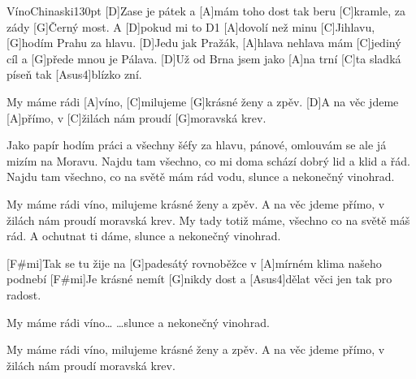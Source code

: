 \begin{song}{Víno}{Chinaski}{130pt}
%
[D]Zase je pátek a [A]mám toho dost
tak beru [C]kramle, za zády [G]{Čer}ný most.
A [D]pokud mi to D1 [A]dovolí
než minu [C]Jihlavu, [G]hodím Prahu za hlavu.
[D]Jedu jak Pražák, [A]hlava nehlava
mám [C]jediný cíl a [G]přede mnou je Pálava.
[D]Už od Brna jsem jako [A]na trní
[C]ta sladká píseň tak [Asus4]blízko zní.

\chorus%
\rl [D]My máme rádi [A]víno,
[C]milujeme [G]krásné ženy a zpěv.
[D]A na věc jdeme [A]přímo,
v [C]{ži}lách nám proudí [G]moravská krev.\rr{}

%
Jako papír hodím práci
a všechny šéfy za hlavu,
pánové, omlouvám se
ale já mizím na Moravu.
Najdu tam všechno, co mi doma schází
dobrý lid a klid a řád.
Najdu tam všechno, co na světě mám rád
vodu, slunce a nekonečný vinohrad.

\chorus%
My máme rádi víno,
milujeme krásné ženy a zpěv.
A na věc jdeme přímo,
v žilách nám proudí moravská krev.
\pagebreak
My tady totiž máme,
všechno co na světě máš rád.
A ochutnat ti dáme,
slunce a nekonečný vinohrad.

\verse{*}%
[F#mi]Tak se tu žije na [G]padesátý rovnoběžce
v [A]mírném klima našeho podnebí
[F#mi]Je krásné nemít [G]nikdy dost
a [Asus4]dělat věci jen tak pro radost.

\chorus%
My máme rádi víno\dots
\dots slunce a nekonečný vinohrad.

My máme rádi víno,
milujeme krásné ženy a zpěv.
A na věc jdeme přímo,
v žilách nám proudí moravská krev.  
\end{song}
